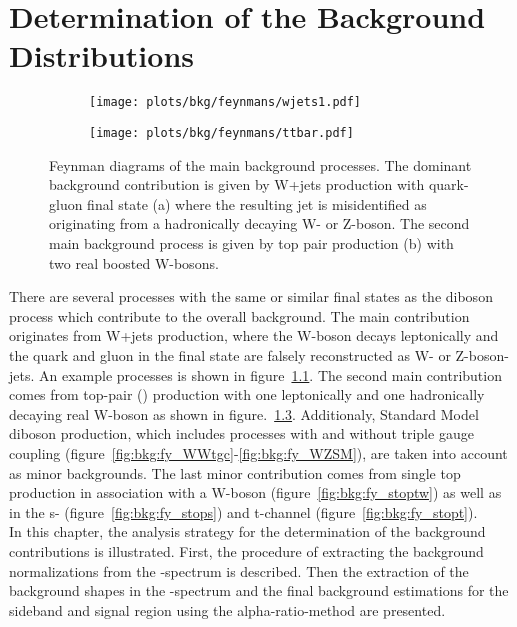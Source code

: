 \chapter{Determination of the Background Distributions}
\label{chap:bkg}
\begin{figure}[H!b]
	\centering
	\begin{subfigure}{0.4\textwidth}
		\texttt{[image: plots/bkg/feynmans/wjets1.pdf]}
		\caption{}
		\label{fig:bkg:fy_wjets1}
	\end{subfigure}
	\begin{subfigure}{0.4\textwidth}
		\texttt{[image: plots/bkg/feynmans/ttbar.pdf]}
		\caption{}
		\label{fig:bkg:fy_ttbar}
	\end{subfigure}
	\caption[Feynman diagrams of the main background processes.]{Feynman diagrams of the main background processes. The dominant background contribution is given by W+jets production with quark-gluon final state (a) where the resulting jet is misidentified as originating from a hadronically decaying W- or Z-boson. The second main background process is given by top pair production (b) with two real boosted W-bosons.}
\end{figure}
There are several processes with the same or similar final states as the diboson process which contribute to the overall background. The main contribution originates from W+jets production, where the W-boson decays leptonically and the quark and gluon in the final state are falsely reconstructed as W- or Z-boson-jets. An example processes is shown in figure~\ref{fig:bkg:fy_wjets1}. The second main contribution comes from top-pair (\ttbar) production with one leptonically and one hadronically decaying real W-boson as shown in figure.~\ref{fig:bkg:fy_ttbar}. Additionaly, Standard Model diboson production, which includes processes with and without triple gauge coupling (figure~\ref{fig:bkg:fy_WWtgc}-\ref{fig:bkg:fy_WZSM}), are taken into account as minor backgrounds. The last minor contribution comes from single top production in association with a W-boson (figure~\ref{fig:bkg:fy_stoptw}) as well as in the s- (figure~\ref{fig:bkg:fy_stops}) and t-channel (figure~\ref{fig:bkg:fy_stopt}).\\
In this chapter, the analysis strategy for the determination of the background contributions is illustrated. First, the procedure of extracting the background normalizations from the \Mpr -spectrum is described. Then the extraction of the background shapes in the \MWV -spectrum and the final background estimations for the sideband and signal region using the alpha-ratio-method are presented.

